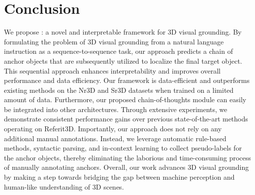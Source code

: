 \section{Conclusion}
\label{sec_concolusion}

We propose {\papernameAbbrev}: a novel and interpretable framework for 3D visual grounding. By formulating the problem of 3D visual grounding from a natural language instruction as a sequence-to-sequence task, our approach predicts a chain of anchor objects that are subsequently utilized to localize the final target object. This sequential approach enhances interpretability and improves overall performance and data efficiency. Our framework is data-efficient and outperforms existing methods on the Nr3D and Sr3D datasets when trained on a limited amount of data. Furthermore, our proposed chain-of-thoughts module can easily be integrated into other architectures. Through extensive experiments, we demonstrate consistent performance gains over previous state-of-the-art methods operating on Referit3D.
Importantly, our approach does not rely on any additional manual annotations. Instead, we leverage automatic rule-based methods, syntactic parsing, and in-context learning to collect pseudo-labels for the anchor objects, thereby eliminating the laborious and time-consuming process of manually annotating anchors.
Overall, our work advances 3D visual grounding by making a step towards bridging the gap between machine perception and human-like understanding of 3D scenes.
